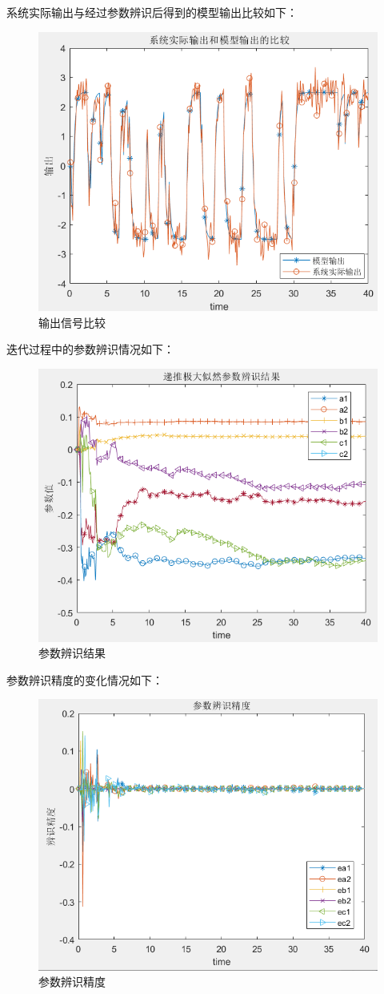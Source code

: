 \documentclass[UTF8, twocolumn]{article}
\begin{document}
系统实际输出与经过参数辨识后得到的模型输出比较如下：
\begin{figure}[H]
    \centering %
    \includegraphics[width=.4\textwidth]{figure/极大似然-电机转速-输出比较.png} 
    \caption{输出信号比较} %
\end{figure}

迭代过程中的参数辨识情况如下：
\begin{figure}[H]
    \centering %
    \includegraphics[width=.4\textwidth]{figure/极大似然-电机转速-参数辨识结果.png} 
    \caption{参数辨识结果} %
\end{figure}

参数辨识精度的变化情况如下：
\begin{figure}[H]
    \centering %
    \includegraphics[width=.4\textwidth]{figure/极大似然-电机转速-参数辨识精度.png} 
    \caption{参数辨识精度} %
\end{figure}
\end{document}
